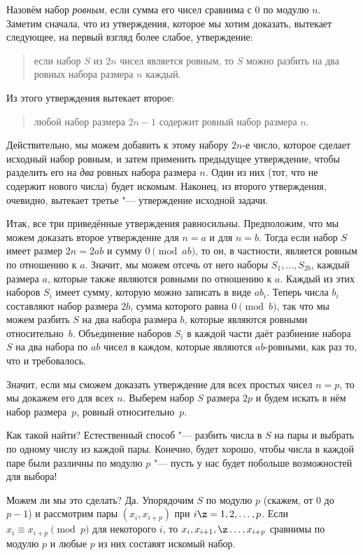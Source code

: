 \documentclass[twoside]{book}
\begin{document}
Назовём набор \emph{ровным}, если сумма его чисел сравнима с $0$ по
модулю $n$.
Заметим сначала, что из утверждения, которое мы хотим
доказать, вытекает следующее, на первый взгляд более слабое,
утверждение:  
\begin{quote}
если набор $S$ из $2n$ чисел является ровным, то $S$
можно разбить на два ровных набора размера $n$ каждый.

\end{quote}
Из этого
утверждения вытекает второе: 
\begin{quote}
любой набор размера $2n-1$ содержит ровный
набор размера $n$.

\end{quote}
Действительно, мы можем добавить к этому набору
$2n$-е число, которое сделает исходный набор ровным, и затем применить
предыдущее утверждение, чтобы разделить его на \emph{два} ровных
набора размера $n$.
Один из них (тот, что не содержит нового числа)
будет искомым. Наконец, из второго утверждения, очевидно, вытекает
третье "--- утверждение исходной задачи.

Итак, все три приведённые утверждения равносильны.
Предположим, что
мы можем доказать второе утверждение для $n = a$ и для $n = b$.
Тогда
если набор $S$ имеет размер $2n = 2ab$ и сумму $0 \pmod {ab}$, то он,
в частности, является ровным по отношению к $a$.
Значит, мы можем
отсечь от него наборы $S_1,\dots,S_{2b}$, каждый размера $a$, которые
также являются ровными по отношению к $a$.
Каждый из этих наборов
$S_i$ имеет сумму, которую можно записать в виде $ab_i$.
Теперь числа
$b_i$ составляют набор размера $2b$, сумма которого равна $0 \pmod b$,
так что мы можем разбить $S$ на два набора размера $b$, которые
являются ровными относительно~$b$.
Объединение наборов $S_i$ в каждой
части даёт разбиение набора $S$ на два набора по $ab$ чисел в каждом,
которые являются $ab$-ровными, как раз то, что и требовалось.

Значит, если мы сможем доказать утверждение для всех простых чисел
$n=p$, то мы докажем его для всех $n$.
Выберем набор $S$ размера $2p$
и будем искать в нём набор размера~$p$, ровный относительно~$p$.

Как такой найти?  Естественный способ "--- разбить числа в $S$ на пары
и выбрать по одному числу из каждой пары.
Конечно, будет хорошо,
чтобы числа в каждой паре были различны по модулю $p$ "--- пусть у нас
будет побольше возможностей для выбора!


Можем ли мы это сделать?
Да.
Упорядочим $S$ по модулю $p$ (скажем,
от $0$ до $p-1$) и рассмотрим пары $(x_i,x_{i+p})$ при $i\z=1,2,\dots,
p$.
Если $x_i\equiv x_{i+p}\pmod p$ для некоторого $i$, то
$x_i,x_{i+1},\z\dots,x_{i+p}$ сравнимы по модулю $p$ и любые $p$ из
них составят искомый набор.
\end{document}
